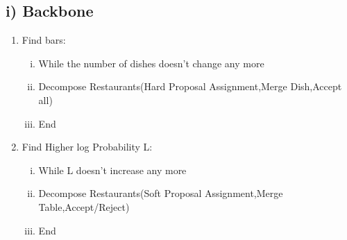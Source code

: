 \documentclass{article}
\begin{document}
\begin{spacing}{1.1}
\subsection{i) Backbone}
\begin{enumerate}[(1)]
\item Find bars:
\begin{enumerate}[(i)]
\item While the number of dishes doesn't change any more
\item Decompose Restaurants(Hard Proposal Assignment,Merge Dish,Accept all)
\item End
\end{enumerate}
\item Find Higher log Probability L:
\begin{enumerate}[(i)]
\item While L doesn't increase any more
\item Decompose Restaurants(Soft Proposal Assignment,Merge Table,Accept/Reject)
\item End
\end{enumerate}
\end{enumerate}


\end{spacing}
\end{document}
